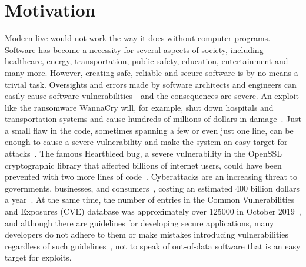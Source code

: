 \documentclass[
a4paper,
pagesize,
pdftex,
12pt,
twoside, %
BCOR=5mm, %
ngerman,
fleqn,
final,
]{scrartcl}
\begin{document}
	
	\setcounter{secnumdepth}{5} %
	
	\newpage
	\section{Motivation}\label{Motivation}
	Modern live would not work the way it does without computer programs. Software has become a necessity for several aspects of society, including healthcare, energy, transportation, public safety, education, entertainment and many more. However, creating safe, reliable and secure software is by no means a trivial task. Oversights and errors made by software architects and engineers can easily cause software vulnerabilities - and the consequences are severe. An exploit like the ransomware WannaCry will, for example, shut down hospitals and transportation systems and cause hundreds of millions of dollars in damage~\cite{DanGoodin.2017}. Just a small flaw in the code, sometimes spanning a few or even just one line, can be enough to cause a severe vulnerability and make the system an easy target for attacks~\cite{Yamaguchi.2012}. The famous Heartbleed bug, a severe vulnerability in the OpenSSL cryptographic library that affected billions of internet users, could have been prevented with two more lines of code~\cite{Durumeric.2014}. Cyberattacks are an increasing threat to governments, businesses, and consumers~\cite{Dam.2017}, costing an estimated 400 billion dollars a year~\cite{Losses.2014}. At the same time, the number of entries in the Common Vulnerabilities and Exposures (CVE) database was approximately over 125000 in October 2019~\cite{CVE}, and although there are guidelines for developing secure applications, many developers do not adhere to them or make mistakes introducing vulnerabilities regardless of such guidelines~\cite{Gupta.2014}, not to speak of out-of-data software that is an easy target for exploits.\\
	
\end{document}
